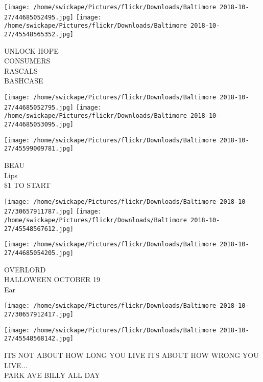 \documentclass[10pt,letterpaper]{article}
\begin{document}
\texttt{[image: /home/swickape/Pictures/flickr/Downloads/Baltimore 2018-10-27/44685052495.jpg]}
\texttt{[image: /home/swickape/Pictures/flickr/Downloads/Baltimore 2018-10-27/45548565352.jpg]}

UNLOCK HOPE\\
CONSUMERS\\
RASCALS\\
BASHCASE
\pagebreak

\texttt{[image: /home/swickape/Pictures/flickr/Downloads/Baltimore 2018-10-27/44685052795.jpg]}
\texttt{[image: /home/swickape/Pictures/flickr/Downloads/Baltimore 2018-10-27/44685053095.jpg]}

\vspace{0.25in}
\texttt{[image: /home/swickape/Pictures/flickr/Downloads/Baltimore 2018-10-27/45599009781.jpg]}

BEAU\\
Lips\\
\$1 TO START
\pagebreak

\texttt{[image: /home/swickape/Pictures/flickr/Downloads/Baltimore 2018-10-27/30657911787.jpg]}
\texttt{[image: /home/swickape/Pictures/flickr/Downloads/Baltimore 2018-10-27/45548567612.jpg]}

\vspace{0.25in}
\texttt{[image: /home/swickape/Pictures/flickr/Downloads/Baltimore 2018-10-27/44685054205.jpg]}

OVERLORD\\
HALLOWEEN OCTOBER 19\\
Ear
\pagebreak

\texttt{[image: /home/swickape/Pictures/flickr/Downloads/Baltimore 2018-10-27/30657912417.jpg]}

\vspace{0.25in}
\texttt{[image: /home/swickape/Pictures/flickr/Downloads/Baltimore 2018-10-27/45548568142.jpg]}

ITS NOT ABOUT HOW LONG YOU LIVE ITS ABOUT HOW WRONG YOU LIVE...\\
PARK AVE BILLY ALL DAY
\pagebreak
\end{document}
